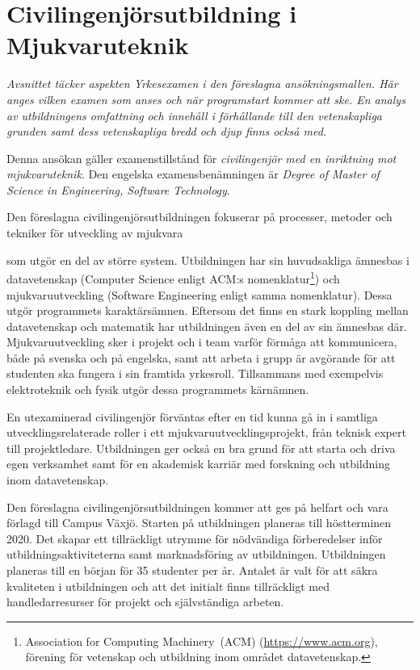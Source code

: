 \chapter{Civilingenjörsutbildning i Mjukvaruteknik}

\begin{tcbdoublebox}
\emph{Avsnittet täcker aspekten Yrkesexamen i den föreslagna ansökningsmallen. Här anges vilken examen som anses och när programstart kommer att ske. En analys av utbildningens omfattning och innehåll i förhållande till den vetenskapliga grunden samt dess vetenskapliga bredd och djup finns också med.}
\end{tcbdoublebox}

Denna ansökan gäller examenstillstånd för \emph{civilingenjör med en inriktning mot mjukvaruteknik}. Den engelska examensbenämningen är \emph{Degree of Master of Science in Engineering, Software Technology}.

Den föreslagna civilingenjörsutbildningen fokuserar på processer, metoder och tekniker för utveckling av mjukvara

som utgör en del av större system. Utbildningen har sin huvudsakliga ämnesbas i datavetenskap (Computer Science enligt ACM:s nomenklatur\footnote{Association for Computing Machinery~(ACM) (\url{https://www.acm.org}), förening för vetenskap och utbildning inom området datavetenskap.}) och mjukvaruutveckling (Software Engineering enligt samma nomenklatur). Dessa utgör programmets karaktärsämnen. Eftersom det finns en stark koppling mellan datavetenskap och matematik har utbildningen även en del av sin ämnesbas där. Mjukvaruutveckling sker i projekt och i team varför förmåga att kommunicera, både på svenska och på engelska, samt att arbeta i grupp är avgörande för att studenten ska fungera i sin framtida yrkesroll. Tillsammans med exempelvis elektroteknik och fysik utgör dessa programmets kärnämnen.

En utexaminerad civilingenjör förväntas efter en tid kunna gå in i samtliga utvecklingsrelaterade roller i ett mjukvaruutvecklingsprojekt, från teknisk expert till projektledare. Utbildningen ger också en bra grund för att starta och driva egen verksamhet samt för en akademisk karriär med forskning och utbildning inom datavetenskap.

Den föreslagna civilingenjörsutbildningen kommer att ges på helfart och vara förlagd till Campus Växjö. Starten på utbildningen planeras till höstterminen 2020. Det skapar ett tillräckligt utrymme för nödvändiga förberedelser inför utbildningsaktiviteterna samt marknadsföring av utbildningen. Utbildningen planeras till en början för 35 studenter per år. Antalet är valt för att säkra kvaliteten i utbildningen och att det initialt finns tillräckligt med handledarresurser för projekt och självständiga arbeten.


